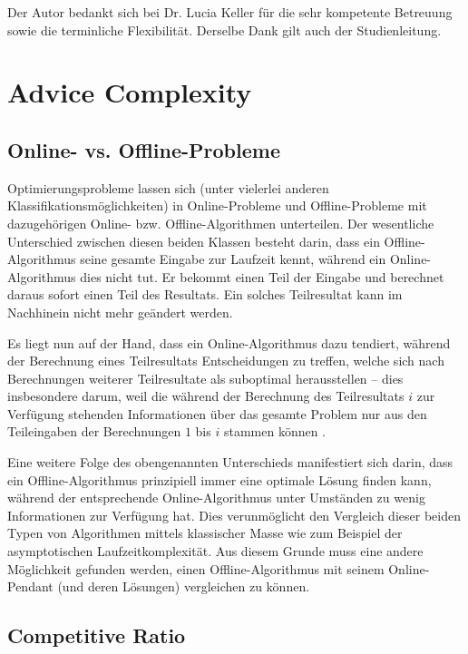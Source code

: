 \documentclass[11pt,abstracton]{scrreprt} %
\theoremstyle{definition}
\begin{document}
\bigskip
Der Autor bedankt sich bei Dr. Lucia Keller für die sehr kompetente Betreuung sowie die terminliche Flexibilität. Derselbe Dank gilt auch der Studienleitung.


\chapter{Advice Complexity}

\section{Online- vs. Offline-Probleme}

Optimierungsprobleme lassen sich (unter vielerlei anderen Klassifikationsmöglichkeiten) in Online-Probleme und Offline-Probleme mit dazugehörigen Online- bzw. Offline-Algo\-rithmen unterteilen. Der wesentliche Unterschied zwischen diesen beiden Klassen besteht darin, dass ein Offline-Algorithmus seine gesamte Eingabe zur Laufzeit kennt, während ein Online-Algorithmus dies nicht tut. Er bekommt einen Teil der Eingabe und berechnet daraus sofort einen Teil des Resultats. Ein solches Teilresultat kann im Nachhinein nicht mehr geändert werden.

Es liegt nun auf der Hand, dass ein Online-Algorithmus dazu tendiert, während der Berechnung eines Teilresultats Entscheidungen zu treffen, welche sich nach Berechnungen weiterer Teilresultate als suboptimal herausstellen -- dies insbesondere darum, weil die während der Berechnung des Teilresultats $i$ zur Verfügung stehenden Informationen über das gesamte Problem nur aus den Teileingaben der Berechnungen $1$ bis $i$ stammen können \cite{BKK}.

\bigskip
Eine weitere Folge des obengenannten Unterschieds manifestiert sich darin, dass ein Offline-Algorithmus prinzipiell immer eine optimale Lösung finden kann, während der entsprechende Online-Algorithmus unter Umständen zu wenig Informationen zur Verfü\-gung hat. Dies verunmöglicht den Vergleich dieser beiden Typen von Algorithmen mittels klassischer Masse wie zum Beispiel der asymptotischen Laufzeitkomplexität. Aus diesem Grunde muss eine andere Möglichkeit gefunden werden, einen Offline-Algorithmus mit seinem Online-Pendant (und deren Lösungen) vergleichen zu können.

\section{Competitive Ratio}
\end{document}
